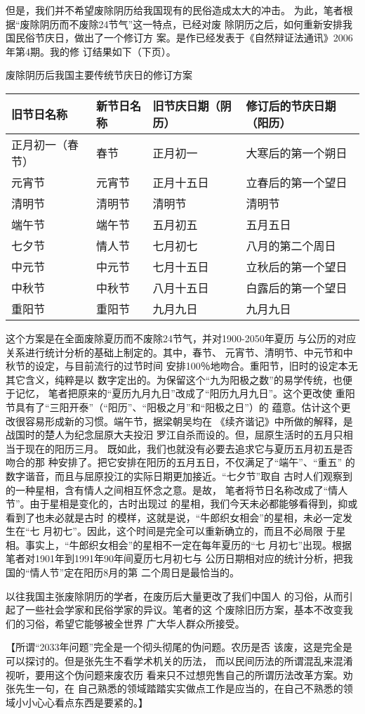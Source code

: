 但是，我们并不希望废除阴历给我国现有的民俗造成太大的冲击。
为此，笔者根据“废除阴历而不废除24节气”这一特点，已经对废
除阴历之后，如何重新安排我国民俗节庆日，做出了一个修订方
案。是作已经发表于《自然辩证法通讯》2006年第4期。我的修
订结果如下（下页）。
\begin{table}
\fangsong
\centerline{废除阴历后我国主要传统节庆日的修订方案}
\vspace{0.5em}
\begin{tabular}{llll}
\hline
旧节日名称 & 新节日名称 & 旧节庆日期（阴历） & 修订后的节庆日期（阳历） \\
\hline
正月初一（春节） & 春节 & 正月初一 & 大寒后的第一个朔日 \\
元宵节 & 元宵节 & 正月十五日 & 立春后的第一个望日 \\
清明节 & 清明节 & 清明节 & 清明节 \\
端午节 & 端午节 & 五月初五 & 五月五日 \\
七夕节 & 情人节 & 七月初七 & 八月的第二个周日 \\
中元节 & 中元节 & 七月十五日 & 立秋后的第一个望日 \\
中秋节 & 中秋节 & 八月十五日 & 白露后的第一个望日 \\
重阳节 & 重阳节 & 九月九日 & 九月九日\\
\hline
\end{tabular}
\end{table}
\normalsize

这个方案是在全面废除夏历而不废除24节气，并对1900-2050年夏历
与公历的对应关系进行统计分析的基础上制定的。其中，春节、
元宵节、清明节、中元节和中秋节的设定，与目前流行的过节时间
安排100％地吻合。重阳节，旧时的设定本无其它含义，纯粹是以
数字定出的。为保留这个“九为阳极之数”的易学传统，也便于记忆，
笔者把原来的“夏历九月九日”改成了“阳历九月九日”。这个更改使
重阳节具有了“三阳开泰”（“阳历”、“阳极之月”和“阳极之日”）的
蕴意。估计这个更改很容易形成新的习惯。端午节，据梁朝吴均在
《续齐谐记》中所做的解释，是战国时的楚人为纪念屈原大夫投汨
罗江自杀而设的。但，屈原生活时的五月只相当于现在的阳历三月。
既如此，我们也就没有必要去追求它与夏历五月初五是否吻合的那
种安排了。把它安排在阳历的五月五日，不仅满足了“端午”、“重五”
的数字谐音，而且与屈原投江的实际日期更加接近。“七夕节”取自
古时人们观察到的一种星相，含有情人之间相互怀念之意。是故，
笔者将节日名称改成了“情人节”。由于星相是变化的，古时出现过
的星相，我们今天未必都能够看得到，抑或看到了也未必就是古时
的模样，这就是说，“牛郎织女相会”的星相，未必一定发生在“七
月初七”。因此，这个时间是完全可以重新确立的，而且不必局限
于星相。事实上，“牛郎织女相会”的星相不一定在每年夏历的“七
月初七”出现。根据笔者对1901年到1991年90年间夏历七月初七与
公历日期相对应的统计分析，把我国的“情人节”定在阳历8月的第
二个周日是最恰当的。

以往我国主张废除阴历的学者，在废历后大量更改了我们中国人
的习俗，从而引起了一些社会学家和民俗学家的异议。笔者的这
个废除旧历方案，基本不改变我们的习俗，希望它能够被全世界
广大华人群众所接受。

\normalfont
【所谓“2033年问题”完全是一个彻头彻尾的伪问题。农历是否
该废，这是完全是可以探讨的。但是张先生不看学术机关的历法，
而以民间历法的所谓混乱来混淆视听，要用这个伪问题来废农历
看来只不过想兜售自己的所谓历法改革方案。劝张先生一句，在
自己熟悉的领域踏踏实实做点工作是应当的，在自己不熟悉的领
域小小心心看点东西是要紧的。】
